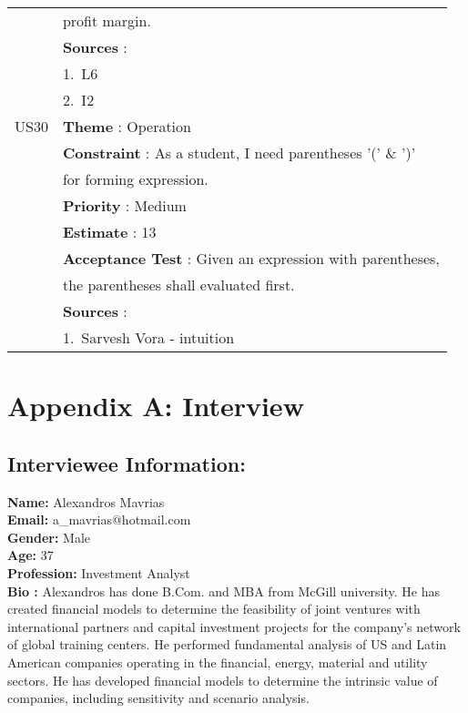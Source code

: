 \documentclass{article}
\begin{document}
\begin{longtable}{|| c || l ||}
         & profit margin.\\
         & \textbf{Sources} : \\
         & 1.~L6\\
         & 2.~I2 \\
         \hline
         US30 & \textbf{Theme} : Operation \\
         & \textbf{Constraint} : As a student, I need parentheses '(' \& ')' \\
         & for forming expression.\\
         & \textbf{Priority} : Medium \\
         & \textbf{Estimate} : 13 \\
         & \textbf{Acceptance Test} : Given an expression with parentheses, \\
         & the parentheses shall evaluated first.\\
         & \textbf{Sources} : \\
         & 1.~Sarvesh Vora - intuition\\
         \hline
         \hline
\end{longtable}
\newpage
\newpage
\section{Appendix A: Interview}
\subsection{Interviewee Information:}
\textbf{Name:} Alexandros Mavrias \\
\textbf{Email:} a\_mavrias@hotmail.com \\
\textbf{Gender:} Male \\
\textbf{Age:} 37 \\
\textbf{Profession:} Investment Analyst \\
\textbf{Bio :} Alexandros has done B.Com. and MBA from McGill university. He has created financial models to determine the feasibility of joint ventures with international partners and capital investment projects for the company’s network of global training centers. He performed fundamental analysis of US and Latin American companies operating in the financial, energy, material and utility sectors. He has developed financial models to determine the intrinsic value of companies, including sensitivity and scenario analysis.
\end{document}
